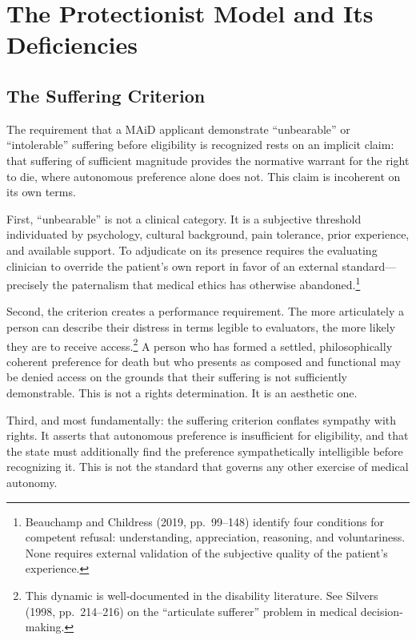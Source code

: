 \documentclass[11pt, letterpaper]{article}
\begin{document}
\section{The Protectionist Model and Its Deficiencies}

\subsection{The Suffering Criterion}

The requirement that a MAiD applicant demonstrate ``unbearable'' or ``intolerable''
suffering before eligibility is recognized rests on an implicit claim: that suffering
of sufficient magnitude provides the normative warrant for the right to die, where
autonomous preference alone does not. This claim is incoherent on its own terms.

First, ``unbearable'' is not a clinical category. It is a subjective threshold
individuated by psychology, cultural background, pain tolerance, prior experience,
and available support. To adjudicate on its presence requires the evaluating clinician
to override the patient's own report in favor of an external standard---precisely the
paternalism that medical ethics has otherwise abandoned.\footnote{%
  Beauchamp and Childress (2019, pp.\ 99--148) identify four conditions for competent
  refusal: understanding, appreciation, reasoning, and voluntariness. None requires
  external validation of the subjective quality of the patient's experience.}

Second, the criterion creates a performance requirement. The more articulately a person
can describe their distress in terms legible to evaluators, the more likely they are
to receive access.\footnote{%
  This dynamic is well-documented in the disability literature. See Silvers (1998,
  pp.\ 214--216) on the ``articulate sufferer'' problem in medical decision-making.}
A person who has formed a settled, philosophically coherent preference for death but
who presents as composed and functional may be denied access on the grounds that their
suffering is not sufficiently demonstrable. This is not a rights determination. It is
an aesthetic one.

Third, and most fundamentally: the suffering criterion conflates sympathy with rights.
It asserts that autonomous preference is insufficient for eligibility, and that the
state must additionally find the preference sympathetically intelligible before
recognizing it. This is not the standard that governs any other exercise of medical
autonomy.
\end{document}
